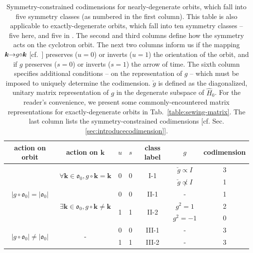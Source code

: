 \documentclass[aps, showpacs, twocolumn, notitlepage, superscriptaddress]{revtex4-1}
\begin{document}
\begin{table}
\begin{tabular}{|c|c|c|c|c|c|c|}
\hline 
action on orbit & action on $\boldsymbol{k}$  & $u$ & $s$  & class label & $g$  & codimension\tabularnewline
\hline 
\multirow{5}{*}{$|g\circ\mathfrak{o}_{0}|=|\mathfrak{o}_{0}|$} & \multirow{2}{*}{$\forall\boldsymbol{k}\in\mathfrak{o}_{0},g\circ\boldsymbol{k}=\boldsymbol{k}$} & \multirow{2}{*}{0} & \multirow{2}{*}{0} & \multirow{2}{*}{I-1} & $\breve{g}\propto I$  & 3\tabularnewline
\cline{6-7} 
 &  &  &  &  & $\breve{g}\not\propto I$  & 1\tabularnewline
\cline{2-7} 
 & \multirow{3}{*}{$\exists\boldsymbol{k}\in\mathfrak{o}_{0},g\circ\boldsymbol{k}\neq\boldsymbol{k}$} & 0 & 0 & II-1 & - & 1\tabularnewline
\cline{3-7} 
 &  & \multirow{2}{*}{1} & \multirow{2}{*}{1} & \multirow{2}{*}{II-2} & $g^{2}=1$  & 2\tabularnewline
\cline{6-7} 
 &  &  &  &  & $g^{2}=-1$  & 0\tabularnewline
\hline 
\multirow{2}{*}{$|g\circ\mathfrak{o}_{0}|\neq|\mathfrak{o}_{0}|$ } & \multirow{2}{*}{-} & 0 & 0 & III-1 & - & 3\tabularnewline
\cline{3-7} 
 &  & 1 & 1 & III-2 & - & 3\tabularnewline
\hline 
\end{tabular}
\caption{Symmetry-constrained codimensions for nearly-degenerate orbits, which fall into five symmetry classes (as numbered in the first column). This table is also applicable to exactly-degenerate orbits, which fall into ten symmetry classes -- five here, and five in  . The second and third columns define how the symmetry acts on the cyclotron orbit. The next two columns  inform us if the mapping $\boldsymbol{k}{\rightarrow}g{\circ}\boldsymbol{k}$ [cf.\ ]  preserves ($u{=}0$) or inverts ($u{=}1$) the orientation of the orbit, and if $g$ preserves ($s{=}0$) or inverts ($s{=}1$) the arrow of time. The sixth column specifies additional conditions -- on the representation of $g$ -- which must be imposed to uniquely determine the codimension. $\breve{g}$ is defined as the diagonalized, unitary matrix representation of $g$ in the degenerate subspace of $\hat{H}_0$. For the reader's convenience, we present some commonly-encountered matrix representations for exactly-degenerate orbits in Tab.\ \ref{table:sewing-matrix}. The last column lists the symmetry-constrained codimensions [cf. Sec. \ref{sec:introducecodimension}]. \label{table:codimension-nearlydegen}}
\end{table}
\end{document}
